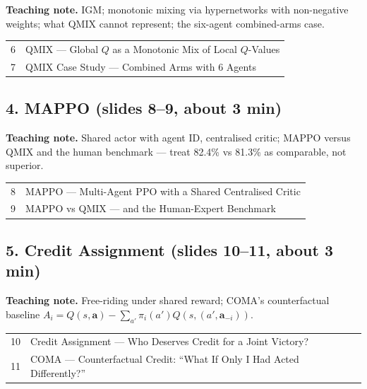 \documentclass[11pt]{article}
\begin{document}
\textbf{Teaching note.} IGM; monotonic mixing via hypernetworks with non-negative weights; what QMIX cannot represent; the six-agent combined-arms case.

\begin{center}\small\renewcommand{\arraystretch}{1.1}\begin{tabularx}{\textwidth}{@{}r X@{}}6 & QMIX --- Global $Q$ as a Monotonic Mix of Local $Q$-Values\\
7 & QMIX Case Study --- Combined Arms with 6 Agents\\\end{tabularx}\end{center}

\subsection{4. MAPPO \normalfont\small\color{GreyN}(slides 8--9, about 3 min)}

\textbf{Teaching note.} Shared actor with agent ID, centralised critic; MAPPO versus QMIX and the human benchmark --- treat 82.4\% vs 81.3\% as comparable, not superior.

\begin{center}\small\renewcommand{\arraystretch}{1.1}\begin{tabularx}{\textwidth}{@{}r X@{}}8 & MAPPO --- Multi-Agent PPO with a Shared Centralised Critic\\
9 & MAPPO vs QMIX --- and the Human-Expert Benchmark\\\end{tabularx}\end{center}

\subsection{5. Credit Assignment \normalfont\small\color{GreyN}(slides 10--11, about 3 min)}

\textbf{Teaching note.} Free-riding under shared reward; COMA's counterfactual baseline $A_i=Q(s,\mathbf a)-\sum_{a'}\pi_i(a')Q(s,(a',\mathbf a_{-i}))$.

\begin{center}\small\renewcommand{\arraystretch}{1.1}\begin{tabularx}{\textwidth}{@{}r X@{}}10 & Credit Assignment --- Who Deserves Credit for a Joint Victory?\\
11 & COMA --- Counterfactual Credit: ``What If Only I Had Acted Differently?''\\\end{tabularx}\end{center}
\end{document}
